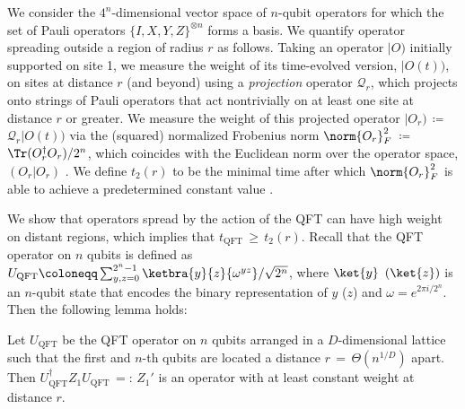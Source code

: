 We consider the $4^n$-dimensional vector space of $n$-qubit operators for which the set of Pauli operators $\{I,X,Y,Z\}^{\otimes n}$ forms a basis.
We quantify operator spreading outside a region of radius $r$ as follows.
Taking an operator $|O)$ initially supported on site 1, we measure the weight of its time-evolved version, $|O(t))$, on sites at distance $r$ (and beyond) using a \emph{projection} operator $\mathcal{Q}_{r}$, which projects onto strings of Pauli operators that act nontrivially on at least one site at distance $r$ or greater.
We measure the weight of this projected operator $|O_r)$\,$\coloneqq$\,$\mathcal{Q}_{r}|O(t))$ via the (squared) normalized Frobenius norm $\norm{O_r}_F^2$\,$\coloneqq$\,$\Tr(O_r^\dag O_r)/2^n$, which coincides with the Euclidean norm over the operator space, $(O_r|O_r)$ \cite{note_norm}.
We define $t_2(r)$ to be the minimal time after which $\norm{O_r}_F^2$ is able to achieve a predetermined constant value \cite{Tran2020}.

We show that operators spread by the action of the QFT can have high weight on distant regions,
which implies that $t_\mathrm{QFT}$\,$\geq$\,$t_2(r)$.
Recall that the QFT operator on $n$ qubits is defined as $U_\mathrm{QFT} \coloneqq \sum_{y,z=0}^{2^n-1} \ketbra{y}{z} {\omega^{yz}}/{\sqrt{2^n}}$, where $\ket{y}$ $(\ket{z})$ is an $n$-qubit state that encodes the binary representation of $y$ ($z$) and $\omega = e^{2\pi i/2^n}$.
Then the following lemma holds:
\begin{lemma*} \label{lem_qft_weight}
Let $U_\mathrm{QFT}$ be the QFT operator on $n$ qubits arranged in a $D$-dimensional lattice such that the first and $n$-th qubits are located a distance $r$\,$=$\,$\Theta(n^{1/D})$ apart.
Then $U_\mathrm{QFT}^\dag Z_1 U_\mathrm{QFT}$\,$=:$\,$Z_1' $ is an operator with at least constant weight at distance $r$.
\end{lemma*}

